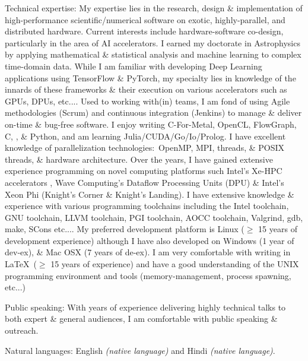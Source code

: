 \documentclass[10pt,a4paper]{article}
\begin{document}
  \inlineheadsection  %
  {Technical expertise:}
  {My expertise lies in the research, design \& implementation of high-performance scientific/numerical software on exotic, highly-parallel, and distributed hardware. Current interests include hardware-software co-design, particularly in the area of AI accelerators. I earned my doctorate in Astrophysics by applying mathematical \& statistical analysis and machine learning to complex time-domain data. While I am familiar with developing Deep Learning applications using TensorFlow \& PyTorch, my specialty lies in knowledge of the innards of these frameworks \& their execution on various accelerators such as GPUs, DPUs, etc.... Used to working with(in) teams, I am fond of using Agile methodologies (Scrum) and continuous integration (Jenkins) to manage \& deliver on-time \& bug-free software. I enjoy writing C-For-Metal, OpenCL, FlowGraph, C\nsp, \CPP\nsp, \& Python, and am learning Julia/\nsp CUDA/\nsp Go/\nsp Io/\nsp Prolog. I have excellent knowledge of parallelization technologies:\ OpenMP, MPI,  threads, \& POSIX threads, \& hardware architecture. Over the years, I have gained extensive experience programming on novel computing platforms such Intel's Xe-HPC accelerators , Wave Computing's Dataflow Processing Units (DPU) \& Intel's Xeon Phi (Knight's Corner \& Knight's Landing). I have extensive knowledge \& experience with various programming toolchains including the Intel toolchain, GNU toolchain, LLVM toolchain, PGI toolchain, AOCC toolchain, Valgrind, gdb, make, SCons etc.... My preferred development platform is Linux ($\geq$ 15 years of development experience) although I have also developed on Windows (1 year of dev-ex), \& Mac OSX (7 years of de-ex). I am very comfortable with writing in \LaTeX \ ($\geq$ 15 years of experience) and have a good understanding of the UNIX programming environment and tools (memory-management, process spawning, etc...)}

  \vspace{1.0em}

  \inlineheadsection
    {Public speaking:}
    {With years of experience delivering highly technical talks to both expert \& general audiences, I am comfortable with public speaking \& outreach.}

  \vspace{1.0em}

  \inlineheadsection
    {Natural languages:}
    {English \emph{(native language)} and Hindi \emph{(native language)}.}
\end{document}
